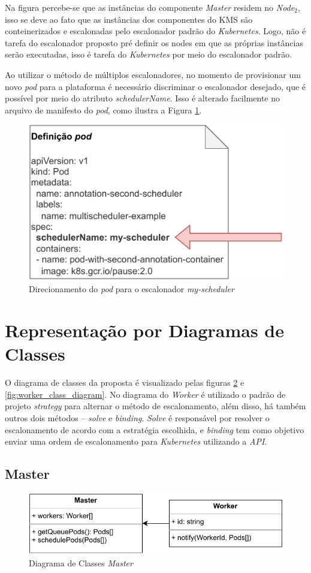 Na figura percebe-se que as instâncias do componente \textit{Master} residem no \textit{Node$_2$}, isso se deve ao fato que as instâncias dos componentes do \ac{KMS} são conteinerizados e escalonadas pelo escalonador padrão do \textit{Kubernetes}. Logo, não é tarefa do escalonador proposto pré definir os nodes em que as próprias instâncias serão executadas, isso é tarefa do \textit{Kubernetes} por meio do escalonador padrão.

Ao utilizar o método de múltiplos escalonadores, no momento de provisionar um novo \textit{pod} para a plataforma é necessário discriminar o escalonador desejado, que é possível por meio do atributo \textit{schedulerName}. Isso é alterado facilmente no arquivo de manifesto do \textit{pod}, como ilustra a Figura \ref{fig:pod_custom_scheduler}.

\begin{figure}[h!]
	\caption{\label{fig:pod_custom_scheduler}Direcionamento do \textit{pod} para o escalonador \textit{my-scheduler}}
	\centering
	\includegraphics[width=0.6\linewidth]{assets/pod-custom-scheduler.pdf}
\end{figure}

\section{Representação por Diagramas de Classes}

O diagrama de classes da proposta é visualizado pelas figuras \ref{fig:master_class_diagram} e \ref{fig:worker_class_diagram}. No diagrama do \textit{Worker} é utilizado o padrão de projeto \textit{strategy} para alternar o método de escalonamento, além disso, há também outros dois métodos -- \textit{solve} e \textit{binding}. \textit{Solve} é responsável por resolver o escalonamento de acordo com a estratégia escolhida, e \textit{binding} tem como objetivo enviar uma ordem de escalonamento para \textit{Kubernetes} utilizando a \textit{API}.

\subsection{Master}
\begin{figure}[h!]
	\caption{\label{fig:master_class_diagram}Diagrama de Classes \textit{Master}}
	\centering
	\includegraphics[width=0.65\linewidth]{assets/master-class-diagram.pdf}
\end{figure}

